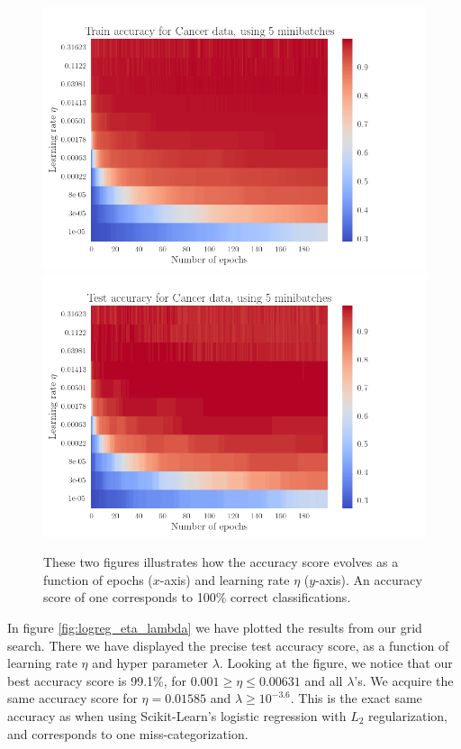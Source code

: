 \documentclass[12pt]{extarticle}
\begin{document}
\begin{figure}[h]
	\includegraphics[width=\linewidth]{../output/plots/reg_Cancer__epochs_eta__Train_accuracy__705107.png}
	\includegraphics[width=\linewidth]{../output/plots/reg_Cancer__epochs_eta__Test_accuracy__924831.png}
	\caption{These two figures illustrates how the accuracy score evolves as a function of epochs ($x$-axis) and learning rate $\eta$ ($y$-axis). An accuracy score of one corresponds to 100\% correct classifications.}\label{fig:logreg_eta_epoch}
\end{figure}

In figure \ref{fig:logreg_eta_lambda} we have plotted the results from our grid search. There we have displayed the precise test accuracy score, as a function of learning rate $\eta$ and hyper parameter $\lambda$. Looking at the figure, we notice that our best accuracy score is 99.1\%, for $0.001 \geq \eta \leq 0.00631$ and all $\lambda$'s. We acquire the same accuracy score for $\eta = 0.01585$ and $\lambda\geq 10^{-3.6}$. This is the exact same accuracy as when using Scikit-Learn's logistic regression with $L_2$ regularization, and corresponds to one miss-categorization.
\end{document}

